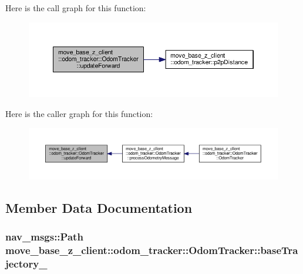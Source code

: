 Here is the call graph for this function\+:\nopagebreak
\begin{figure}[H]
\begin{center}
\leavevmode
\includegraphics[width=350pt]{classmove__base__z__client_1_1odom__tracker_1_1OdomTracker_a12cee73239bc7685c645f8f52859b61f_cgraph}
\end{center}
\end{figure}




Here is the caller graph for this function\+:\nopagebreak
\begin{figure}[H]
\begin{center}
\leavevmode
\includegraphics[width=350pt]{classmove__base__z__client_1_1odom__tracker_1_1OdomTracker_a12cee73239bc7685c645f8f52859b61f_icgraph}
\end{center}
\end{figure}




\subsection{Member Data Documentation}
\subsubsection[{\texorpdfstring{base\+Trajectory\+\_\+}{baseTrajectory_}}]{\setlength{\rightskip}{0pt plus 5cm}nav\+\_\+msgs\+::\+Path move\+\_\+base\+\_\+z\+\_\+client\+::odom\+\_\+tracker\+::\+Odom\+Tracker\+::base\+Trajectory\+\_\+\hspace{0.3cm}{\ttfamily [protected]}}\hypertarget{classmove__base__z__client_1_1odom__tracker_1_1OdomTracker_a83fa5a9bfe0b2683eee33444d3f030ea}{}\label{classmove__base__z__client_1_1odom__tracker_1_1OdomTracker_a83fa5a9bfe0b2683eee33444d3f030ea}


